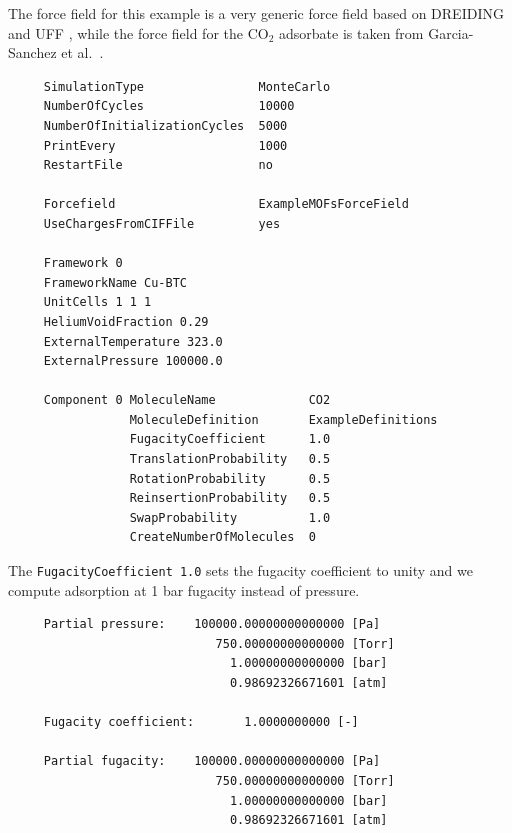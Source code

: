 The force field for this example is a very generic force field based on DREIDING \cite{Mayo1990} and UFF \cite{Rappe1992}, while
the force field for the CO$_2$ adsorbate is taken from Garcia-Sanchez et al.\ \cite{GarciaSanchez2009}.
\begin{tiny}
\begin{verbatim}
     SimulationType                MonteCarlo
     NumberOfCycles                10000
     NumberOfInitializationCycles  5000
     PrintEvery                    1000
     RestartFile                   no
     
     Forcefield                    ExampleMOFsForceField
     UseChargesFromCIFFile         yes
     
     Framework 0
     FrameworkName Cu-BTC
     UnitCells 1 1 1
     HeliumVoidFraction 0.29
     ExternalTemperature 323.0
     ExternalPressure 100000.0
     
     Component 0 MoleculeName             CO2
                 MoleculeDefinition       ExampleDefinitions
                 FugacityCoefficient      1.0
                 TranslationProbability   0.5
                 RotationProbability      0.5
                 ReinsertionProbability   0.5
                 SwapProbability          1.0
                 CreateNumberOfMolecules  0
\end{verbatim}
\end{tiny}
The \verb+FugacityCoefficient 1.0+ sets the fugacity coefficient to unity and we compute adsorption at 1 bar fugacity instead of pressure.
\begin{tiny}
\begin{verbatim}
     Partial pressure:    100000.00000000000000 [Pa]
                             750.00000000000000 [Torr]
                               1.00000000000000 [bar]
                               0.98692326671601 [atm]
     
     Fugacity coefficient:       1.0000000000 [-]
     
     Partial fugacity:    100000.00000000000000 [Pa]
                             750.00000000000000 [Torr]
                               1.00000000000000 [bar]
                               0.98692326671601 [atm]
\end{verbatim}
\end{tiny}

